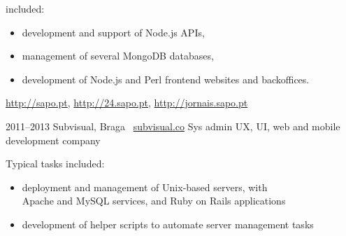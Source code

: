 \documentclass[a4paper]{friggeri-cv}
\begin{document}
\begin{entrylist}
{{    included:}}
    {\begin{itemize}
        \item development and support of Node.js APIs,
        \item management of several MongoDB databases,
        \item development of Node.js and Perl frontend websites and backoffices.
    \end{itemize}
    \url{http://sapo.pt}, \url{http://24.sapo.pt}, \url{http://jornais.sapo.pt}
    }
  \entry
    {2011--2013}
    {Subvisual, Braga \textendash~\url{subvisual.co}}
    {Sys admin}
    {UX, UI, web and mobile development company}
    {Typical tasks included:
        \begin{itemize}
            \item deployment and management of Unix-based
            servers, with\\
            Apache and MySQL services, and Ruby on Rails applications
            \item development of helper scripts to automate
            server management tasks
            \end{itemize}
    }
\end{entrylist}
\end{document}
